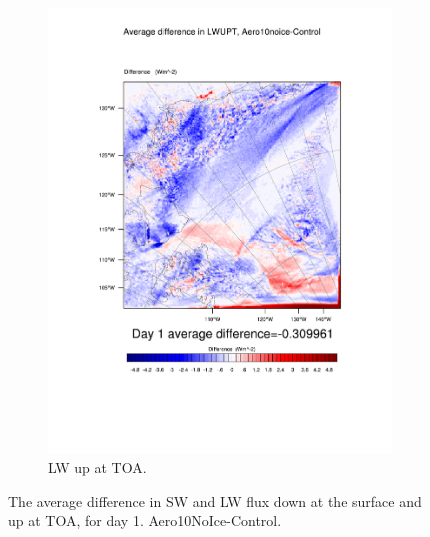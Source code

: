 \begin{figure}
\begin{subfigure}{0.48\textwidth}
		\includegraphics[width=\textwidth]{results/aero10ni/diff_Aero10NoIce_LWUPT_Day1.pdf}
		\caption{LW up at TOA.}
		\label{subfig:lwup_r4Day1}
	\end{subfigure}
	\caption{The average difference in SW and LW flux down at the surface and up at TOA, for day 1. Aero10NoIce-Control.}
	\label{fig:radiation_r4Day1}
\end{figure}

